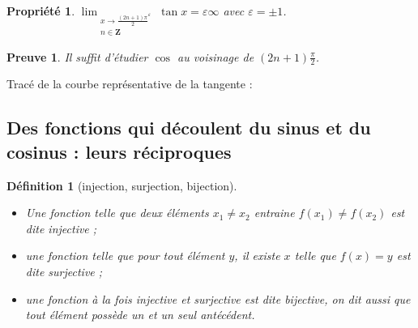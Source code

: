 \documentclass[11pt,a4paper,french]{article}
\newcommand{\Z}{\mathbf{Z}}
\theoremstyle{break}
\newtheorem{definition}{Définition}
\newtheorem{propriete}{Propriété}
\theoremstyle{plain}
\theoremstyle{nonumberplain}
\newtheorem{preuve}{Preuve}
\theoremstyle{nonumberbreak}
\begin{document}
\begin{propriete}
  $\lim_{\substack{x\to\frac{(2n+1)\pi}2^{\varepsilon}\\n\in\Z}} \tan x =
  \varepsilon\infty$ avec $\varepsilon = \pm 1$.
\end{propriete}
\begin{preuve}
  Il suffit d'étudier $\cos$ au voisinage de $(2n+1)\frac{\pi}2$.
\end{preuve}

\begin{center}
\end{center}

Tracé de la courbe représentative de la tangente :

\begin{center}
\end{center}

\subsection{Des fonctions qui découlent du sinus et du cosinus : leurs
réciproques}

\begin{definition}[injection, surjection, bijection]
  \begin{itemize}
    \item Une fonction telle que deux éléments $x_1 \neq x_2$ entraine
      $f(x_1) \neq f(x_2)$ est dite injective ;
    \item une fonction telle que pour tout élément $y$, il existe $x$
      telle que $f(x) = y$ est dite surjective ;
    \item une fonction à la fois injective et surjective est dite
      bijective, on dit aussi que tout élément possède un et un seul
      antécédent.
  \end{itemize}
\end{definition}
\end{document}
